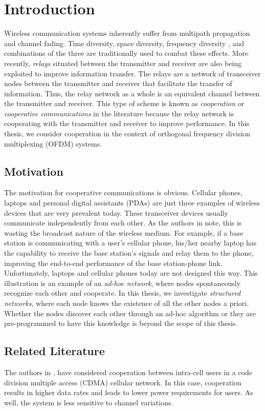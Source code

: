 \chapter{Introduction}
\label{chap:introduction}

Wireless communication systems inherently suffer from multipath propagation and channel fading.  Time diversity, space diversity, frequency diversity \cite{book:Proakis01}, and combinations of the three are traditionally used to combat these effects.  More recently, \emph{relays} situated between the transmitter and receiver are also being exploited to improve information transfer.  The relays are a network of transceiver nodes between the transmitter and receiver that facilitate the transfer of information.  Thus, the relay network as a whole is an equivalent channel between the transmitter and receiver.  This type of scheme is known as \emph{cooperation} or \emph{cooperative communications} in the literature because the relay network is cooperating with the transmitter and receiver to improve performance.  In this thesis, we consider cooperation in the context of orthogonal frequency division multiplexing (OFDM) systems.

\section{Motivation}
The motivation for cooperative communications is obvious.  Cellular phones, laptops and personal digital assistants (PDAs) are just three examples of wireless devices that are very prevalent today.  These transceiver devices usually communicate independently from each other.  As the authors in \cite{article:Laneman01} note, this is wasting the broadcast nature of the wireless medium.  For example, if a base station is communicating with a user's cellular phone, his/her nearby laptop has the capability to receive the base station's signals and relay them to the phone, improving the end-to-end performance of the base station-phone link.  Unfortunately, laptops and cellular phones today are not designed this way.  This illustration is an example of an \emph{ad-hoc network}, where nodes spontaneously recognize each other and cooperate.  In this thesis, we investigate \emph{structured networks}, where each node knows the existence of all the other nodes a priori.  Whether the nodes discover each other through an ad-hoc algorithm or they are pre-programmed to have this knowledge is beyond the scope of this thesis.  

\section{Related Literature}
The authors in  \cite{article:Sendonaris01}, \cite{article:Sendonaris02} have considered cooperation between intra-cell users in a code division multiple access (CDMA) cellular network.  In this case, cooperation results in higher data rates and leads to lower power requirements for users.  As well, the system is less sensitive to channel variations.

